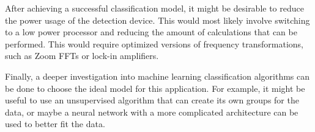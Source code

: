 After achieving a successful classification model, it might be desirable to reduce the power usage of the detection device.  This would most likely involve switching to a low power processor and reducing the amount of calculations that can be performed.  This would require optimized versions of frequency transformations, such as Zoom FFTs or lock-in amplifiers.

Finally, a deeper investigation into machine learning classification algorithms can be done to choose the ideal model for this application.  For example, it might be useful to use an unsupervised algorithm that can create its own groups for the data, or maybe a neural network with a more complicated architecture can be used to better fit the data.




